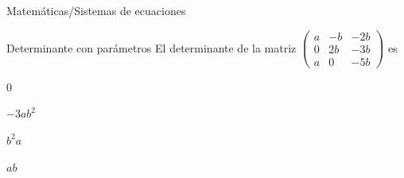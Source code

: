 \documentclass{article}
\begin{document}
\begin{quiz}{Matemáticas/Sistemas de ecuaciones}
	\begin{multi}{Determinante con parámetros}
		El determinante de la matriz $\left(\begin{array}{ccc} a & - b & - 2 b\\0 & 2 b & - 3 b\\a & 0 & - 5 b \end{array}\right)$ es
		\item 0
		\item* $- 3 a b^{2}$
		\item $b^2 a$
		\item $a b$
	\end{multi}
	
\end{quiz}
\end{document}
